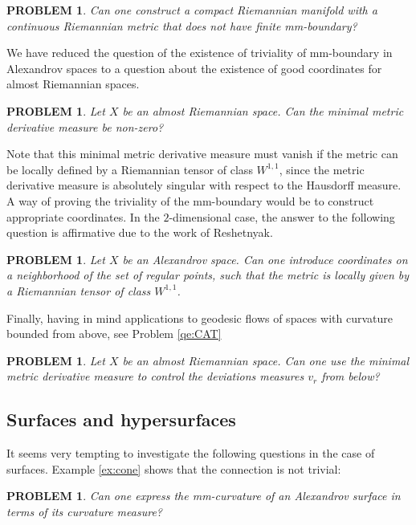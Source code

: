 \documentclass[12pt,leqno]{amsart}
\numberwithin{equation}{section}
\newtheorem{quest}[thm]{PROBLEM}
\theoremstyle{definition}
\theoremstyle{remark}
\begin{document}
\begin{quest}
 Can one construct a compact Riemannian manifold with a continuous Riemannian metric
that does not have finite mm-boundary?
\end{quest}


We have reduced the question of the existence of triviality of mm-boundary in Alexandrov spaces to a question
about the existence of good coordinates for almost Riemannian spaces.   

\begin{quest}
Let $X$ be an almost Riemannian space. Can  the minimal metric derivative measure be non-zero?
\end{quest}

Note that this minimal metric derivative measure must vanish if the metric can be locally defined  by a Riemannian
tensor of class $W^{1,1}$, since the metric derivative measure is absolutely singular with respect to the Hausdorff measure.
A way of proving the triviality of the mm-boundary would be to construct appropriate coordinates. In the $2$-dimensional case, the answer to the following question is affirmative due to the work of Reshetnyak.

\begin{quest}
Let $X$ be an Alexandrov space. Can one introduce coordinates on a neighborhood of the set of regular points, such that the metric is locally given by a Riemannian tensor of class $W^{1,1}$.
\end{quest}


Finally, having in mind applications to geodesic flows of spaces with curvature bounded from above, see Problem \ref{qe:CAT}

\begin{quest}  \label{qe:BV}
Let $X$ be an  almost Riemannian space. Can one use the minimal metric derivative measure to control the deviations measures $v_r$ from below?
\end{quest} 

\subsection{Surfaces and  hypersurfaces}
It seems very tempting to investigate the following questions in the case of surfaces.  Example \ref{ex:cone} shows that the connection is not trivial:


\begin{quest}
Can one express the mm-curvature of an Alexandrov  surface in terms of its curvature measure?
\end{quest}
\end{document}
